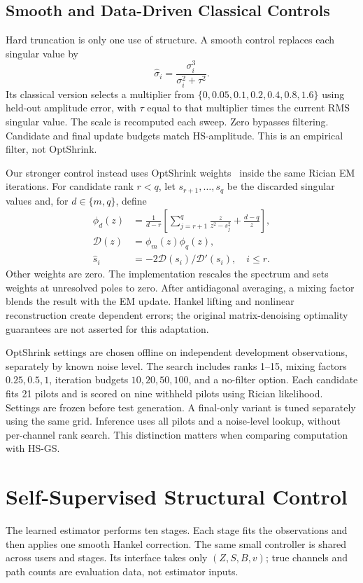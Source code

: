 \documentclass[10pt,journal,letterpaper]{IEEEtran}
\begin{document}
\subsection{Smooth and Data-Driven Classical Controls}
Hard truncation is only one use of structure. A smooth control replaces each singular value by
\begin{equation}
 \widehat\sigma_i=\frac{\sigma_i^3}{\sigma_i^2+\tau^2}.
 \label{eq:shrink}
\end{equation}
Its classical version selects a multiplier from $\{0,0.05,0.1,0.2,0.4,0.8,1.6\}$ using held-out amplitude error, with $\tau$ equal to that multiplier times the current RMS singular value. The scale is recomputed each sweep. Zero bypasses filtering. Candidate and final update budgets match HS-amplitude. This is an empirical filter, not OptShrink.

Our stronger control instead uses OptShrink weights~\cite{nadakuditi2014} inside the same Rician EM iterations. For candidate rank $r<q$, let $s_{r+1},\ldots,s_q$ be the discarded singular values and, for $d\in\{m,q\}$, define
\begin{align}
 \phi_d(z)&=\frac{1}{d-r}\left[\sum_{j=r+1}^{q}\frac{z}{z^2-s_j^2}+\frac{d-q}{z}\right],\\
 \mathcal D(z)&=\phi_m(z)\phi_q(z),\nonumber\\
 \widehat s_i&=-2\mathcal D(s_i)/\mathcal D'(s_i),\quad i\le r.
\end{align}
Other weights are zero. The implementation rescales the spectrum and sets weights at unresolved poles to zero. After antidiagonal averaging, a mixing factor blends the result with the EM update. Hankel lifting and nonlinear reconstruction create dependent errors; the original matrix-denoising optimality guarantees are not asserted for this adaptation.

OptShrink settings are chosen offline on independent development observations, separately by known noise level. The search includes ranks 1--15, mixing factors $0.25,0.5,1$, iteration budgets $10,20,50,100$, and a no-filter option. Each candidate fits 21 pilots and is scored on nine withheld pilots using Rician likelihood. Settings are frozen before test generation. A final-only variant is tuned separately using the same grid. Inference uses all pilots and a noise-level lookup, without per-channel rank search. This distinction matters when comparing computation with HS-GS.

\section{Self-Supervised Structural Control}
\label{sec:learned}
The learned estimator performs ten stages. Each stage fits the observations and then applies one smooth Hankel correction. The same small controller is shared across users and stages. Its interface takes only $(Z,S,B,v)$; true channels and path counts are evaluation data, not estimator inputs.
\end{document}
